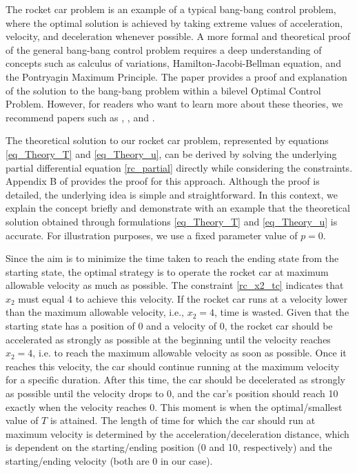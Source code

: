 \documentclass  [
  paper    = a4,
  BCOR     = 10mm,
  twoside,
  fontsize = 12pt,
  fleqn,
  toc      = bibnumbered,
  toc      = listofnumbered,
  numbers  = noendperiod,
  headings = normal,
  listof   = leveldown,
  version  = 3.03
]                                       {scrreprt}
\newcommand{\<}{\langle}
\renewcommand{\>}{\rangle}
\begin{document}
The rocket car problem is an example of a typical bang-bang control problem, where the optimal solution is achieved by taking extreme values of acceleration, velocity, and deceleration whenever possible. A more formal and theoretical proof of the general bang-bang control problem requires a deep understanding of concepts such as calculus of variations, Hamilton-Jacobi-Bellman equation, and the Pontryagin Maximum Principle. The paper \cite{KM16} provides a proof and explanation of the solution to the bang-bang problem within a bilevel Optimal Control Problem. However, for readers who want to learn more about these theories, we recommend papers such as \cite{EJ89}, \cite{RV99}, and \cite{BD05}.

The theoretical solution to our rocket car problem, represented by equations \ref{eq_Theory_T} and \ref{eq_Theory_u}, can be derived by solving the underlying partial differential equation \ref{rc_partial} directly while considering the constraints. Appendix B of \cite{MatSch22} provides the proof for this approach. Although the proof is detailed, the underlying idea is simple and straightforward. In this context, we explain the concept briefly and demonstrate with an example that the theoretical solution obtained through formulations \ref{eq_Theory_T} and \ref{eq_Theory_u} is accurate. For illustration purposes, we use a fixed parameter value of $p=0$.

Since the aim is to minimize the time taken to reach the ending state from the starting state, the optimal strategy is to operate the rocket car at maximum allowable velocity as much as possible. The constraint \ref{rc_x2_tc} indicates that $x_2$ must equal 4 to achieve this velocity. If the rocket car runs at a velocity lower than the maximum allowable velocity, i.e., $x_2=4$, time is wasted. Given that the starting state has a position of 0 and a velocity of 0, the rocket car should be accelerated as strongly as possible at the beginning until the velocity reaches $x_2=4$, i.e. to reach the maximum allowable velocity as soon as possible. Once it reaches this velocity, the car should continue running at the maximum velocity for a specific duration. After this time, the car should be decelerated as strongly as possible until the velocity drops to 0, and the car's position should reach 10 exactly when the velocity reaches 0. This moment is when the optimal/smallest value of $T$ is attained. The length of time for which the car should run at maximum velocity is determined by the acceleration/deceleration distance, which is dependent on the starting/ending position (0 and 10, respectively) and the starting/ending velocity (both are 0 in our case).
\end{document}
